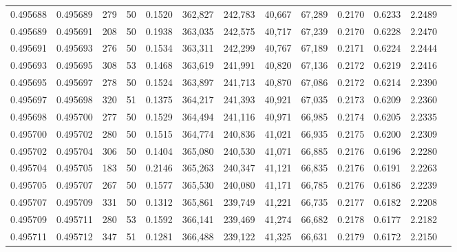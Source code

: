 \begin{tabular}{rrrrrrrrrrrrr}
0.495688 & 0.495689 &   279 &  50 &                                     0.1520 & 362,827 & 242,783 &  40,667 &  67,289 & 0.2170 & 0.6233 & 2.2489 \\
0.495689 & 0.495691 &   208 &  50 &                                     0.1938 & 363,035 & 242,575 &  40,717 &  67,239 & 0.2170 & 0.6228 & 2.2470 \\
0.495691 & 0.495693 &   276 &  50 &                                     0.1534 & 363,311 & 242,299 &  40,767 &  67,189 & 0.2171 & 0.6224 & 2.2444 \\
0.495693 & 0.495695 &   308 &  53 &                                     0.1468 & 363,619 & 241,991 &  40,820 &  67,136 & 0.2172 & 0.6219 & 2.2416 \\
0.495695 & 0.495697 &   278 &  50 &                                     0.1524 & 363,897 & 241,713 &  40,870 &  67,086 & 0.2172 & 0.6214 & 2.2390 \\
0.495697 & 0.495698 &   320 &  51 &                                     0.1375 & 364,217 & 241,393 &  40,921 &  67,035 & 0.2173 & 0.6209 & 2.2360 \\
0.495698 & 0.495700 &   277 &  50 &                                     0.1529 & 364,494 & 241,116 &  40,971 &  66,985 & 0.2174 & 0.6205 & 2.2335 \\
0.495700 & 0.495702 &   280 &  50 &                                     0.1515 & 364,774 & 240,836 &  41,021 &  66,935 & 0.2175 & 0.6200 & 2.2309 \\
0.495702 & 0.495704 &   306 &  50 &                                     0.1404 & 365,080 & 240,530 &  41,071 &  66,885 & 0.2176 & 0.6196 & 2.2280 \\
0.495704 & 0.495705 &   183 &  50 &                                     0.2146 & 365,263 & 240,347 &  41,121 &  66,835 & 0.2176 & 0.6191 & 2.2263 \\
0.495705 & 0.495707 &   267 &  50 &                                     0.1577 & 365,530 & 240,080 &  41,171 &  66,785 & 0.2176 & 0.6186 & 2.2239 \\
0.495707 & 0.495709 &   331 &  50 &                                     0.1312 & 365,861 & 239,749 &  41,221 &  66,735 & 0.2177 & 0.6182 & 2.2208 \\
0.495709 & 0.495711 &   280 &  53 &                                     0.1592 & 366,141 & 239,469 &  41,274 &  66,682 & 0.2178 & 0.6177 & 2.2182 \\
0.495711 & 0.495712 &   347 &  51 &                                     0.1281 & 366,488 & 239,122 &  41,325 &  66,631 & 0.2179 & 0.6172 & 2.2150 \\

\end{tabular}
